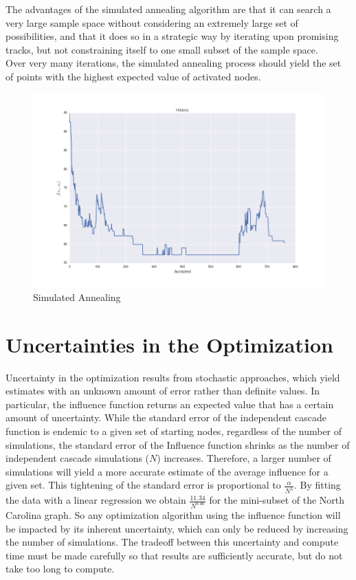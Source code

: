 \documentclass[11pt]{scrartcl} %
\begin{document}
The advantages of the simulated annealing algorithm are that it can search a very large sample space without considering an extremely large set of possibilities, and that it does so in a strategic way by iterating upon promising tracks, but not constraining itself to one small subset of the sample space.  \\

Over very many iterations, the simulated annealing process should yield the set of points with the highest expected value of activated nodes. \\

\begin{figure}[h!]
\centering
\includegraphics[width=10 cm]{SimAn}
\caption{Simulated Annealing}
\label{fig:SA}
\end{figure}

\section{Uncertainties in the Optimization}

Uncertainty in the optimization results from stochastic approaches, which yield estimates with an unknown amount of error rather than definite values.  In particular, the influence function returns an expected value that has a certain amount of uncertainty.  While the standard error of the independent cascade function is endemic to a given set of starting nodes, regardless of the number of simulations, the standard error of the Influence function shrinks as the number of independent cascade simulations ($N$) increases.  Therefore, a larger number of simulations will yield a more accurate estimate of the average influence for a given set.  This tightening of the standard error is proportional to $\frac{\alpha}{N^{\lambda}}$. By fitting the data with a linear regression we obtain  $\frac{11.34}{N^{0.46}}$ for the mini-subset of the North Carolina graph.  So any optimization algorithm using the influence function will be impacted by its inherent uncertainty, which can only be reduced by increasing the number of simulations.  The tradeoff between this uncertainty and compute time must be made carefully so that results are sufficiently accurate, but do not take too long to compute.  \\
	
\end{document}
